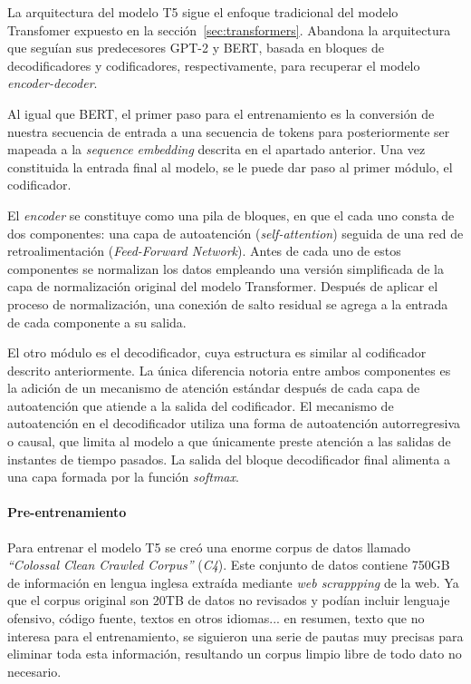 La arquitectura del modelo T5 sigue el enfoque tradicional del modelo Transfomer expuesto en la sección~\ref{sec:transformers}. Abandona la arquitectura que seguían sus predecesores GPT-2 y BERT, basada en bloques de decodificadores y codificadores, respectivamente, para recuperar el modelo \textit{encoder-decoder}.

Al igual que BERT, el primer paso para el entrenamiento es la conversión de nuestra secuencia de entrada a una secuencia de tokens para posteriormente ser mapeada a la \textit{sequence embedding} descrita en el apartado anterior. Una vez constituida la entrada final al modelo, se le puede dar paso al primer módulo, el codificador. 

El \textit{encoder} se constituye como una pila de bloques, en que el cada uno consta de dos componentes: una capa de autoatención (\textit{self-attention}) seguida de una red de retroalimentación (\textit{Feed-Forward Network}). Antes de cada uno de estos componentes se normalizan los datos empleando una versión simplificada de la capa de normalización original del modelo Transformer. Después de aplicar el proceso de normalización, una conexión de salto residual se agrega a la entrada de cada componente a su salida.

El otro módulo es el decodificador, cuya estructura es similar al codificador descrito anteriormente. La única diferencia notoria entre ambos componentes es la adición de un mecanismo de atención estándar después de cada capa de autoatención que atiende a la salida del codificador. El mecanismo de autoatención en el decodificador utiliza una forma de autoatención autorregresiva o causal, que limita al modelo a que únicamente preste atención a las salidas de instantes de tiempo pasados. La salida del bloque decodificador final alimenta a una capa formada por la función \textit{softmax}.



\paragraph{Pre-entrenamiento}\hfill

Para entrenar el modelo T5 se creó una enorme corpus de datos llamado \textit{``Colossal Clean Crawled Corpus''} (\textit{C4}). Este conjunto de datos contiene 750GB de información en lengua inglesa extraída mediante \textit{web scrappping} de la web. Ya que el corpus original son 20TB de datos no revisados y podían incluir lenguaje ofensivo, código fuente, textos en otros idiomas... en resumen, texto que no interesa para el entrenamiento, se siguieron una serie de pautas muy precisas para eliminar toda esta información, resultando un corpus limpio libre de todo dato no necesario.

